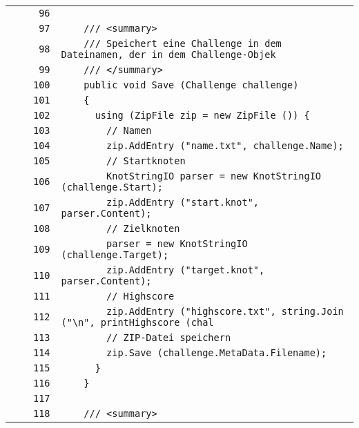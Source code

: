 \documentclass[a4paper,10pt]{article}
\begin{document}
\begin{longtable}[l]{lrrl}
\cellcolor{gray} &  & \verb~96~ & \verb~~\\
\cellcolor{gray} &  & \verb~97~ & \verb~    /// <summary>~\\
\cellcolor{gray} &  & \verb~98~ & \verb~    /// Speichert eine Challenge in dem Dateinamen, der in dem Challenge-Objek~\\
\cellcolor{gray} &  & \verb~99~ & \verb~    /// </summary>~\\
\cellcolor{gray} &  & \verb~100~ & \verb~    public void Save (Challenge challenge)~\\
\cellcolor{gray} &  & \verb~101~ & \verb~    {~\\
\cellcolor{gray} &  & \verb~102~ & \verb~      using (ZipFile zip = new ZipFile ()) {~\\
\cellcolor{gray} &  & \verb~103~ & \verb~        // Namen~\\
\cellcolor{gray} &  & \verb~104~ & \verb~        zip.AddEntry ("name.txt", challenge.Name);~\\
\cellcolor{gray} &  & \verb~105~ & \verb~        // Startknoten~\\
\cellcolor{gray} &  & \verb~106~ & \verb~        KnotStringIO parser = new KnotStringIO (challenge.Start);~\\
\cellcolor{gray} &  & \verb~107~ & \verb~        zip.AddEntry ("start.knot", parser.Content);~\\
\cellcolor{gray} &  & \verb~108~ & \verb~        // Zielknoten~\\
\cellcolor{gray} &  & \verb~109~ & \verb~        parser = new KnotStringIO (challenge.Target);~\\
\cellcolor{gray} &  & \verb~110~ & \verb~        zip.AddEntry ("target.knot", parser.Content);~\\
\cellcolor{gray} &  & \verb~111~ & \verb~        // Highscore~\\
\cellcolor{gray} &  & \verb~112~ & \verb~        zip.AddEntry ("highscore.txt", string.Join ("\n", printHighscore (chal~\\
\cellcolor{gray} &  & \verb~113~ & \verb~        // ZIP-Datei speichern~\\
\cellcolor{gray} &  & \verb~114~ & \verb~        zip.Save (challenge.MetaData.Filename);~\\
\cellcolor{gray} &  & \verb~115~ & \verb~      }~\\
\cellcolor{gray} &  & \verb~116~ & \verb~    }~\\
\cellcolor{gray} &  & \verb~117~ & \verb~~\\
\cellcolor{gray} &  & \verb~118~ & \verb~    /// <summary>~\\

\end{longtable}
\end{document}
